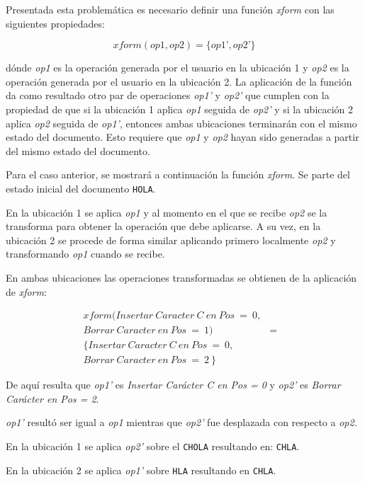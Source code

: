 \documentclass[12pt,a4paper]{article}
\begin{document}
	Presentada esta problemática es necesario definir una función \textit{xform} con las siguientes propiedades:
	
	\begin{equation} xform(op1,op2) = \lbrace op1’,op2’ \rbrace
	\end{equation}

	dónde \textit{op1} es la operación generada por el usuario en la ubicación 1 y \textit{op2} es la operación
	generada por el usuario en la ubicación 2. La aplicación de la función da como resultado otro par de operaciones
	\textit{op1’} y \textit{op2’} que cumplen con la propiedad de que si la ubicación 1 aplica \textit{op1} seguida
	de  \textit{op2’}  y si la ubicación 2 aplica \textit{op2} seguida de \textit{op1’}, entonces ambas
	ubicaciones terminarán con el mismo estado del documento.
	Esto requiere que \textit{op1} y \textit{op2} hayan sido generadas a partir del mismo estado del documento.

	Para el caso anterior, se mostrará a continuación la función \textit{xform}.
	Se parte del estado inicial del documento \texttt{HOLA}.

	En la ubicación 1 se aplica \textit{op1} y al momento en el que se recibe \textit{op2} se la transforma 
	para obtener la operación que debe aplicarse. A su vez, en la ubicación 2 se procede de forma similar
	aplicando primero localmente \textit{op2} y transformando \textit{op1} cuando se recibe.

	En ambas ubicaciones las operaciones transformadas se obtienen de la aplicación de \textit{xform}:
	
\begin{eqnarray*}
  xform(Insertar\ Caracter\ C\ en\ Pos\ =\ 0, \\
  Borrar\ Caracter\ en\ Pos\ =\ 1) & = & \\ 
  \lbrace Insertar\ Caracter\ C\ en\ Pos\ =\ 0, \\
  Borrar\ Caracter\ en\ Pos\ =\ 2\ \rbrace  
\end{eqnarray*}

	De aquí resulta que \textit{op1’} es \textit{Insertar Carácter C en Pos = 0} y \textit{op2’} es 
	\textit{Borrar Carácter en Pos = 2}.

\textit{op1’} resultó ser igual a \textit{op1} mientras que \textit{op2’} fue desplazada con respecto a 
\textit{op2.}

En la ubicación 1 se aplica \textit{op2’} sobre el \texttt{CHOLA} resultando en: \texttt{CHLA}.

En la ubicación 2 se aplica \textit{op1’} sobre \texttt{HLA} resultando en \texttt{CHLA}.
\end{document}
